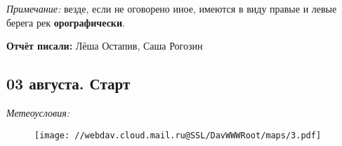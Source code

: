 \textit{Примечание:} везде, если не оговорено иное, имеются в виду правые и левые берега рек \textbf{орографически}.

\textbf{Отчёт писали:} Лёша Остапив, Саша Рогозин
\subsection{03 августа. Старт}
\textit{Метеоусловия: }

\begin{figure}[h!]
	\centering
	\texttt{[image: //webdav.cloud.mail.ru@SSL/DavWWWRoot/maps/3.pdf]}
	\label{fig:mini_18}
\end{figure}



\clearpage